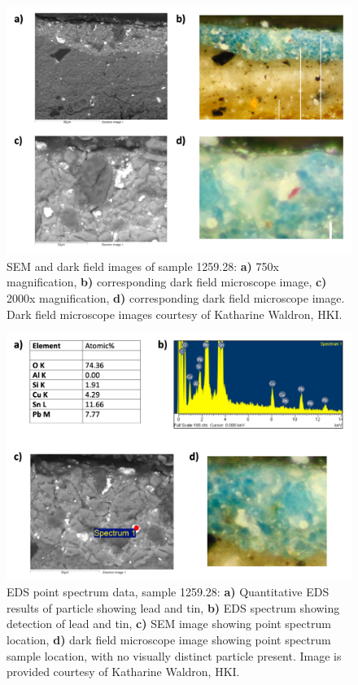 \begin{figure}[H]
  \centering
  \includegraphics[width=0.8\linewidth]{1259.28_imgs}
\caption[SEM and dark field images of sample 1259.28.]{SEM and dark field images of sample 1259.28: \textbf{a)} 750x magnification, \textbf{b)} corresponding dark field microscope image, \textbf{c)} 2000x magnification, \textbf{d)} corresponding dark field microscope image. Dark field microscope images courtesy of Katharine Waldron, HKI.}
\label{fig:1259.28_imgs}
\end{figure}

\begin{figure}[H]
  \centering
  \includegraphics[width=0.8\linewidth]{1259.28_pointspec}
\caption[EDS point spectrum data, sample 1259.28.]{EDS point spectrum data, sample 1259.28: \textbf{a)} Quantitative EDS results of particle showing lead and tin, \textbf{b)} EDS spectrum showing detection of lead and tin, \textbf{c)} SEM image showing point spectrum location, \textbf{d)} dark field microscope image showing point spectrum sample location, with no visually distinct particle present. Image is provided courtesy of Katharine Waldron, HKI.}
\label{fig:1259.28_pointspec}
\end{figure}

